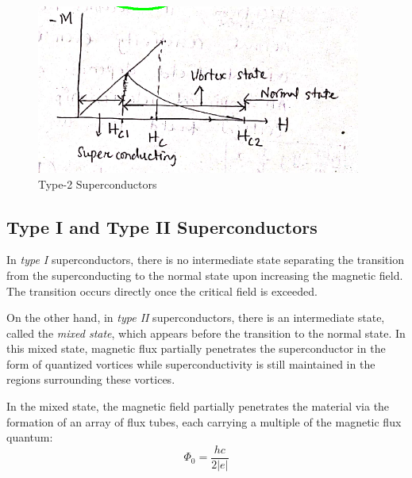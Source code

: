 \documentclass{article}
\begin{document}
\begin{figure}
    \begin{center}
        \includegraphics[width=0.95\textwidth]{figures/4.png}
    \end{center}
    \caption{Type-2 Superconductors}\label{fig:}
\end{figure}

\subsection{Type I and Type II Superconductors}

In \emph{type I} superconductors, there is no intermediate state separating the transition from the superconducting to the normal state upon increasing the magnetic field. The transition occurs directly once the critical field is exceeded.

On the other hand, in \emph{type II} superconductors, there is an intermediate state, called the \emph{mixed state}, which appears before the transition to the normal state. In this mixed state, magnetic flux partially penetrates the superconductor in the form of quantized vortices while superconductivity is still maintained in the regions surrounding these vortices.

In the mixed state, the magnetic field partially penetrates the material via the formation of an array of flux tubes, each carrying a multiple of the magnetic flux quantum:
\[
\Phi_0 = \frac{hc}{2|e|}
\]
\end{document}
